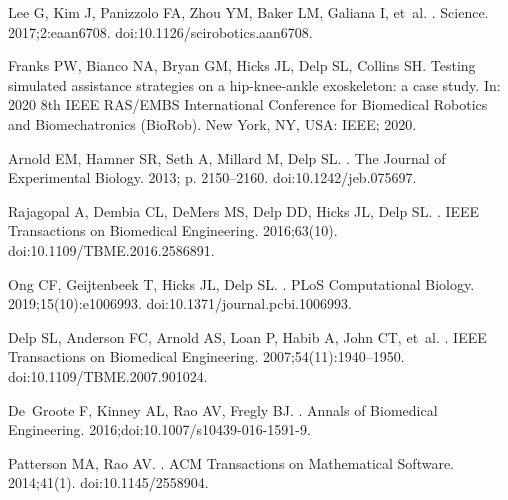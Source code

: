 \documentclass[10pt,letterpaper]{article}
\begin{document}
\begin{thebibliography}{10}
Lee G, Kim J, Panizzolo FA, Zhou YM, Baker LM, Galiana I, et~al.
.
\newblock Science. 2017;2:eaan6708.
\newblock doi:{10.1126/scirobotics.aan6708}.

Franks PW, Bianco NA, Bryan GM, Hicks JL, Delp SL, Collins SH.
\newblock Testing simulated assistance strategies on a hip-knee-ankle
  exoskeleton: a case study.
\newblock In: 2020 8th IEEE RAS/EMBS International Conference for Biomedical
  Robotics and Biomechatronics (BioRob). New York, NY, USA: IEEE; 2020.

Arnold EM, Hamner SR, Seth A, Millard M, Delp SL.
.
\newblock The Journal of Experimental Biology. 2013; p. 2150--2160.
\newblock doi:{10.1242/jeb.075697}.

Rajagopal A, Dembia CL, DeMers MS, Delp DD, Hicks JL, Delp SL.
.
\newblock IEEE Transactions on Biomedical Engineering. 2016;63(10).
\newblock doi:{10.1109/TBME.2016.2586891}.

Ong CF, Geijtenbeek T, Hicks JL, Delp SL.
.
\newblock PLoS Computational Biology. 2019;15(10):e1006993.
\newblock doi:{10.1371/journal.pcbi.1006993}.

Delp SL, Anderson FC, Arnold AS, Loan P, Habib A, John CT, et~al.
.
\newblock IEEE Transactions on Biomedical Engineering. 2007;54(11):1940--1950.
\newblock doi:{10.1109/TBME.2007.901024}.

De~Groote F, Kinney AL, Rao AV, Fregly BJ.
.
\newblock Annals of Biomedical Engineering.
  2016;doi:{10.1007/s10439-016-1591-9}.

Patterson MA, Rao AV.
.
\newblock ACM Transactions on Mathematical Software. 2014;41(1).
\newblock doi:{10.1145/2558904}.


\end{thebibliography}
\end{document}

